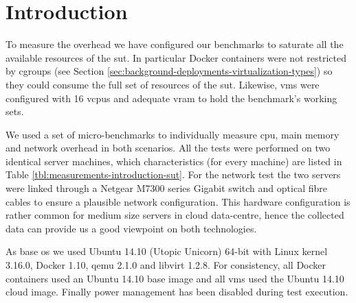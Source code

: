 %
%
\section{Introduction}
\label{sec:measurements-introduction}
To measure the overhead we have configured our benchmarks to saturate all the available resources of the
\acf{sut}. In particular Docker containers were not restricted by cgroups (see Section 
\ref{sec:background-deployments-virtualization-types}) so they could consume the full set of resources
of the \ac{sut}. Likewise, \ac{vm}s were configured with 16 v\acs{cpu}s and adequate v\acs{ram} to hold
the benchmark's working sets.

We used a set of micro-benchmarks to individually measure \acs{cpu}, main memory and network overhead in
both scenarios. All the tests were performed on two identical server machines, which characteristics
(for every machine) are listed in Table \ref{tbl:measurements-introduction-sut}. For the network test
the two servers were linked through a Netgear M7300 series Gigabit switch and optical fibre cables to ensure
a plausible network configuration. This hardware configuration is rather common for medium size servers in
cloud data-centre, hence the collected data can provide us a good viewpoint on both technologies.

As base \acs{os} we used Ubuntu 14.10 (Utopic Unicorn) 64-bit with Linux kernel 3.16.0, Docker 1.10,
\ac{qemu} 2.1.0 and libvirt 1.2.8. For consistency, all Docker containers used an Ubuntu 14.10 base
image and all \ac{vm}s used the Ubuntu 14.10 cloud image. Finally power management has been disabled
during test execution.

